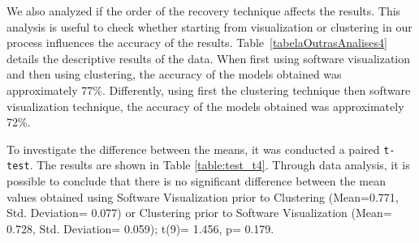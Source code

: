 {%

We also analyzed if the order of the recovery technique affects the results. This analysis is useful to check whether starting from visualization or clustering in our process influences the accuracy of the results. 
Table~\ref{tabelaOutrasAnalises4} details the descriptive results of the data. When first using software visualization and then using clustering, the accuracy of the models 
obtained was approximately 77\%. Differently, using first the clustering technique then software visualization technique, the accuracy of the models 
obtained was approximately 72\%.

\begin{table}[h]
	\centering
	\caption{Descriptive data table related to the order of the techniques.}
	\label{tabelaOutrasAnalises4}
\end{table}

To investigate the difference between the means, it was conducted a paired \texttt{t-test}. The results are shown in Table \ref{table:test_t4}. Through data analysis, 
it is possible to conclude that there is no significant difference between the mean values obtained using Software Visualization prior to Clustering (Mean=0.771,  Std. Deviation= 0.077) or 
Clustering prior to Software Visualization (Mean= 0.728, Std. Deviation= 0.059); t(9)= 1.456, p= 0.179.

}
